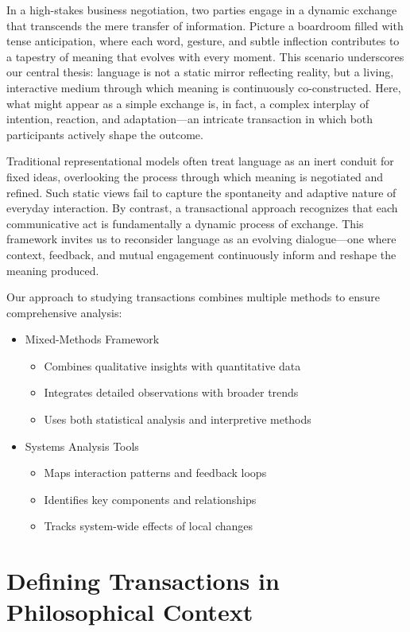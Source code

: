 \documentclass[12pt]{article}
\begin{document}
In a high-stakes business negotiation, two parties engage in a dynamic exchange that transcends the mere transfer of information. Picture a boardroom filled with tense anticipation, where each word, gesture, and subtle inflection contributes to a tapestry of meaning that evolves with every moment. This scenario underscores our central thesis: language is not a static mirror reflecting reality, but a living, interactive medium through which meaning is continuously co-constructed. Here, what might appear as a simple exchange is, in fact, a complex interplay of intention, reaction, and adaptation---an intricate transaction in which both participants actively shape the outcome.

Traditional representational models often treat language as an inert conduit for fixed ideas, overlooking the process through which meaning is negotiated and refined. Such static views fail to capture the spontaneity and adaptive nature of everyday interaction. By contrast, a transactional approach recognizes that each communicative act is fundamentally a dynamic process of exchange. This framework invites us to reconsider language as an evolving dialogue---one where context, feedback, and mutual engagement continuously inform and reshape the meaning produced.

Our approach to studying transactions combines multiple methods to ensure comprehensive analysis:

\begin{itemize}
\item Mixed-Methods Framework
  \begin{itemize}
  \item Combines qualitative insights with quantitative data
  \item Integrates detailed observations with broader trends
  \item Uses both statistical analysis and interpretive methods
  \end{itemize}
\item Systems Analysis Tools
  \begin{itemize}
  \item Maps interaction patterns and feedback loops
  \item Identifies key components and relationships
  \item Tracks system-wide effects of local changes
  \end{itemize}
\end{itemize}

\section{Defining Transactions in Philosophical Context}
\end{document}
